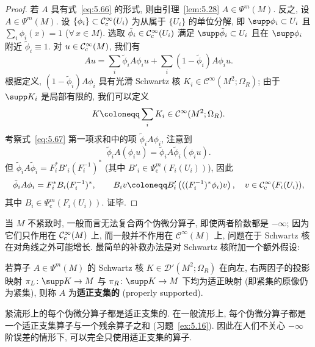 \begin{proof}
若 $A$ 具有式~\eqref{eq:5.66} 的形式, 则由引理~\ref{lem:5.28} $A \in \Psi^m(M)$. 反之, 设 $A \in \Psi^m(M)$. 设 $\{\phi_i\} \subset \mathcal{C}_{\mathrm{c}}^\infty(U_i)$ 为从属于 $\{U_i\}$ 的单位分解, 即 $\supp\phi_i \subset U_i$ 且 $\sum_i \phi_i(x) = 1$ ($\forall\,x \in M$). 选取 $\tilde{\phi}_i \in \mathcal{C}_{\mathrm{c}}^\infty(U_i)$ 满足 $\supp\tilde{\phi}_i \subset U_i$ 且在 $\supp\phi_i$ 附近 $\tilde{\phi}_i \equiv 1$. 对 $u \in \mathcal{C}_{\mathrm{c}}^\infty(M)$, 我们有
\begin{equation}\label{eq:5.67}
    A u = \sum_i \tilde{\phi}_i A \phi_i u + \sum_i (1 - \tilde{\phi}_i) A \phi_i u.
\end{equation}
根据定义, $(1 - \tilde{\phi}_i) A \phi_i$ 具有光滑 Schwartz 核 $K_i \in \mathcal{C}^\infty(M^2; \Omega_R)$; 由于 $\supp K_i$ 是局部有限的, 我们可以定义
\begin{equation}\label{eq:5.68}
    K \defeq \sum_i K_i \in \mathcal{C}^\infty(M^2; \Omega_R).
\end{equation}
考察式~\eqref{eq:5.67} 第一项求和中的项 $\tilde{\phi}_i A \phi_i$, 注意到
\begin{equation}\label{eq:5.69}
    \tilde{\phi}_i A(\phi_i u) = \tilde{\phi}_i A \tilde{\phi}_i (\phi_i u).
\end{equation}
但 $\tilde{\phi}_i A \tilde{\phi}_i = F_i^* B'_i (F_i^{-1})^*$ (其中 $B'_i \in \Psi_{\mathrm{c}}^m(F_i(U_i))$), 因此
\begin{equation}\label{eq:5.70}
    \tilde{\phi}_i A \phi_i = F_i^* B_i (F_i^{-1})^*, \qquad B_i v \defeq B'_i \left( ((F_i^{-1})^* \phi_i) v \right), \quad v \in \SmoothComp(F_i(U_i)),
\end{equation}
其中 $B_i \in \Psi_{\mathrm{c}}^m(F_i(U_i))$. 证毕.
\end{proof}

当 $M$ 不紧致时, 一般而言无法复合两个伪微分算子, 即使两者阶数都是 $-\infty$; 因为它们只作用在 $\mathcal{C}_{\mathrm{c}}^\infty(M)$ 上, 而一般并不作用在 $\mathcal{C}^\infty(M)$ 上, 问题在于 Schwartz 核在对角线之外可能增长. 最简单的补救办法是对 Schwartz 核附加一个额外假设:

\begin{definition}[适正支集伪微分算子]\label{def:5.30}
若算子 $A \in \Psi^m(M)$ 的 Schwartz 核 $K \in \mathcal{D}'(M^2; \Omega_R)$ 在向左, 右两因子的投影映射 $\pi_L \colon \supp K \to M$ 与 $\pi_R \colon \supp K \to M$ 下均为适正映射 (即紧集的原像仍为紧集), 则称 $A$ 为\textbf{适正支集的} (properly supported).
\end{definition}

紧流形上的每个伪微分算子都是适正支集的. 在一般流形上, 每个伪微分算子都是一个适正支集算子与一个残余算子之和 (习题~\ref{ex:5.16}). 因此在人们不关心 $-\infty$ 阶误差的情形下, 可以完全只使用适正支集的算子.

